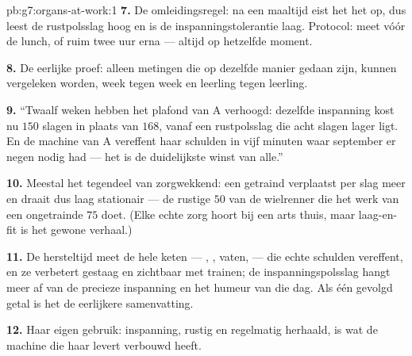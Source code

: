 \begin{solution}{pb:g7:organs-at-work:1}
\textbf{7.} De omleidingsregel: na een maaltijd eist het
 het  op, dus leest de rustpolsslag hoog en is
de inspanningstolerantie laag. Protocol: meet vóór de lunch, of ruim twee
uur erna --- altijd op hetzelfde moment.

\textbf{8.} De eerlijke proef: alleen metingen die op dezelfde manier
gedaan zijn, kunnen vergeleken worden, week tegen week en leerling tegen
leerling.

\textbf{9.} ``Twaalf weken hebben het plafond van A verhoogd: dezelfde
inspanning kost nu $150$ slagen in plaats van $168$, vanaf een
rustpolsslag die acht slagen lager ligt. En de machine van A vereffent
haar schulden in vijf minuten waar september er negen nodig had --- het
 is de duidelijkste winst van alle.''

\textbf{10.} Meestal het tegendeel van zorgwekkend: een getraind 
verplaatst per slag meer  en draait dus laag stationair --- de
rustige $50$ van de wielrenner die het werk van een ongetrainde $75$ doet.
(Elke echte zorg hoort bij een arts thuis, maar laag-en-fit is het
gewone verhaal.)

\textbf{11.} De hersteltijd meet de hele keten --- , , vaten,
 --- die echte schulden vereffent, en ze verbetert gestaag en
zichtbaar met trainen; de inspanningspolsslag hangt meer af van de
precieze inspanning en het humeur van die dag. Als één gevolgd getal is
het  de eerlijkere samenvatting.

\textbf{12.} Haar eigen gebruik: inspanning, rustig en regelmatig
herhaald, is wat de machine die haar levert verbouwd heeft.
\end{solution}
